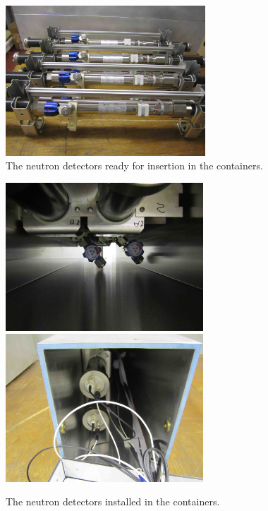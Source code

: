 \begin{figure}[htbp]
\begin{center}
\includegraphics[width=75mm]{Chapter6/figures/neutronTubes1.jpg}
\caption{The neutron detectors ready for insertion in the containers.}
\label{fig:neutronDetTubes}
\end{center}
\end{figure}

\begin{figure}[htbp]
\begin{center}
\includegraphics[width=74mm]{Chapter6/figures/neutronTubesInstall1.jpg}
\includegraphics[width=74mm]{Chapter6/figures/neutronTubesInstall2.jpg}
\caption{The neutron detectors installed in the containers.}
\label{fig:neutronDetInstalled}
\end{center}
\end{figure}

